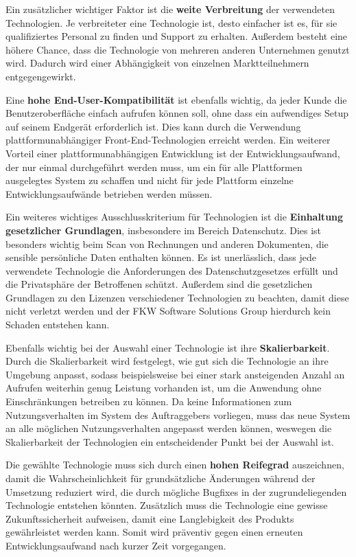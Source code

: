Ein zusätzlicher wichtiger Faktor ist die \textbf{weite Verbreitung} der verwendeten Technologien. 
Je verbreiteter eine Technologie ist, desto einfacher ist es, für sie qualifiziertes Personal zu finden und Support zu erhalten. 
Außerdem besteht eine höhere Chance, dass die Technologie von mehreren anderen Unternehmen genutzt wird. 
Dadurch wird einer Abhängigkeit von einzelnen Marktteilnehmern entgegengewirkt.

Eine \textbf{hohe End-User-Kompatibilität} ist ebenfalls wichtig, da jeder Kunde die Benutzeroberfläche einfach aufrufen können soll, ohne dass ein aufwendiges Setup auf seinem Endgerät erforderlich ist. 
Dies kann durch die Verwendung plattformunabhängiger Front-End-Technologien erreicht werden. 
Ein weiterer Vorteil einer plattformunabhängigen Entwicklung ist der Entwicklungsaufwand, der nur einmal durchgeführt werden muss, um ein für alle Plattformen ausgelegtes System zu schaffen und nicht für jede Plattform einzelne Entwicklungsaufwände betrieben werden müssen.

Ein weiteres wichtiges Ausschlusskriterium für Technologien ist die \textbf{Einhaltung gesetzlicher Grundlagen}, insbesondere im Bereich Datenschutz. 
Dies ist besonders wichtig beim Scan von Rechnungen und anderen Dokumenten, die sensible persönliche Daten enthalten können. 
Es ist unerlässlich, dass jede verwendete Technologie die Anforderungen des Datenschutzgesetzes erfüllt und die Privatsphäre der Betroffenen schützt. 
Außerdem sind die gesetzlichen Grundlagen zu den Lizenzen verschiedener Technologien zu beachten, damit diese nicht verletzt werden und der FKW Software Solutions Group hierdurch kein Schaden entstehen kann.

Ebenfalls wichtig bei der Auswahl einer Technologie ist ihre \textbf{Skalierbarkeit}. 
Durch die Skalierbarkeit wird festgelegt, wie gut sich die Technologie an ihre Umgebung anpasst, sodass beispielsweise bei einer stark ansteigenden Anzahl an Aufrufen weiterhin genug Leistung vorhanden ist, um die Anwendung ohne Einschränkungen betreiben zu können. 
Da keine Informationen zum Nutzungsverhalten im System des Auftraggebers vorliegen, muss das neue System an alle möglichen Nutzungsverhalten angepasst werden können, weswegen die Skalierbarkeit der Technologien ein entscheidender Punkt bei der Auswahl ist.

Die gewählte Technologie muss sich durch einen \textbf{hohen Reifegrad} auszeichnen, damit die Wahrscheinlichkeit für grundsätzliche Änderungen während der Umsetzung reduziert wird, die durch mögliche Bugfixes in der zugrundeliegenden Technologie entstehen könnten.
Zusätzlich muss die Technologie eine gewisse Zukunftssicherheit aufweisen, damit eine Langlebigkeit des Produkts gewährleistet werden kann. 
Somit wird präventiv gegen einen erneuten Entwicklungsaufwand nach kurzer Zeit vorgegangen.

